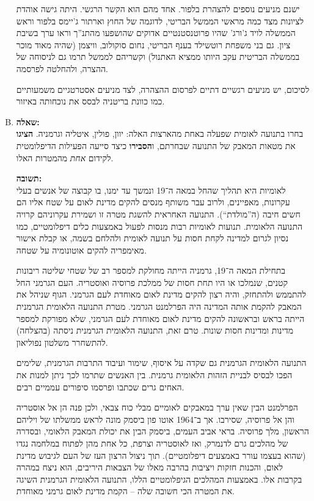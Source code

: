 \documentclass[a4paper]{article}
\newcommand\hl[1]   {#1}
\begin{document}
\begin{enumerate}[A.]
			ישנם מניעים נוספים להצהרת בלפור. אחד מהם הוא הקשר הרגשי. היתה גישה אוהדת לציונות מצד כמה מראשי הממשל הבריטי, לדוגמה של החוץ וארתור ג'יימס בלפור וראש הממשלה לויד ג'ורג' שהיו פרוטנסטנטיים אדוקים שהושפעו מהתנ''ך וראו ערך בשיבת ציון. גם בני משפחת רוטשילד בענף הבריטי, נחום סוקולוב, וויצמן (שהיה מאוד מוכר בממשלה הבריטית עקב היותו ממציא האתנול) וקשריהם לממשל תרמו גם לניסוחה של ההצרה, ולהחלטה לפרסמה. 
			
			לסיכום, יש מניעים רגשיים דתיים לפרסום ההצהרה, לצד מניעים אסטרטגיים משמעותיים כמו כוונת בריטניה לבסס את נוכחותה באיזור. 
			
			
			\item \textbf{שאלה: }\\
			בחרו בתנועה לאומית שפעלה באחת מהארצות האלה: יוון, פולין, איטליה וגרמניה. \textbf{הציגו} את מטאות המאבק של התנועה שבחרתם, ו\textbf{הסבירו} כיצד סייעה הפעילות הדיפלומטית לקידום \textit{אחת} מהמטרות האלו. 
			
			\textbf{תשובה: }\\
			\hl{לאומיות} היא תהליך שהחל במאה ה־19 ונמשך עד ימנו, בו קבוצה של אנשים בעלי עקרונות, מאפיינים, ולרוב עבר משותף מנסים להקים \hl{מדינת לאום} על שטח אליו הם חשים חיבה (ה''מולדת``). התנועה האחראית להשגת מטרה זו ושמירת עקרוניהם קרויה \hl{התנועה הלאומית}. תנועות לאומיות רבות מנסות לפעול באמצעות כלים דיפלומטיים, כמו נסיון לגרום למדינה לקחת חסות על תנועה לאומית ולהלחם בשמה, או קבלת אישור מאימפריה להקים אוטונומיה על שטחה. 
			
			בתחילת המאה ה־19, גרמניה הייתה מחולקת למספר רב של שטחי שליטה ריבונות קטנים, שנמלכו או היו תחת חסות של ממלכת פרוסיה ואוסטריה. העם הגרמני החל להתממש ולהתחזק, והיה רצון להקים מדינת לאום מאוחדת לעם הגרמני. הגוף שניהל את המאבק להקמת אותה המדינה היה \hl{הפרלמנט הגרמני}. מטרת התנועה הלאומית הגרמנית הייתה בראש ובראשונה להקים מדינת לאום מאוחדת לעם הגרמני, שלא מפורקת למספר מדינות ומדינות חסות שונות. טרם זאת, התנועה הלאומית הגרמנית ניסתה (בהצלחה) להתשחרר משלטון נפוליאון. 
			
			התנועה הלאומית הגרמנית גם שקדה על איסוף, שימור ועיבוד התרבות הגרמנית, שלימים הפכו לבסיס לבניית הזהות הלאומית גרמנית. בין האנשים שתרמו לכך ניתן למנות את \hl{האחים גרים} שכתבו ופרסמו סיפורים עממיים רבים. 
			
			הפרלמנט הבין שאין ערך במאבקים לאומיים מבלי כוח צבאי, ולכן פנה הן אל אוסטריה והן אל פרוסיה, שסירבו. אך ב־1964 \hl{אוטו פון ביסמק} מונה לראש ממשלתו של ויליהם הראשון, מלך פרוסיה. בראי אביב העמים, ביסמק הבין את יכולת המאבק הלאומי, ובסדרה של מהלכים גרם לדנמרק, ואז לאוסטריה וצרפת, כל אחת מהן לפתוח במלחמה נגדו (שהוא בעצמו עורר באמצעים דיפלומטיים). תוך ניצול הרצון העז של העם לגיבוש מדינת לאום, והכנות חזקות ויציבות בהרבה מאלו של הצבאות היריבים, הוא ניצח במהרה בקרבות אלו. באמצעות המהלכים הגיפלומטיים הללו, התנועה הלאומית הגרמנית השיגה את המטרה הכי חשובה שלה – הקמת מדינת לאום גרמני מאוחדת. 
			
		\end{enumerate}
\end{document}

